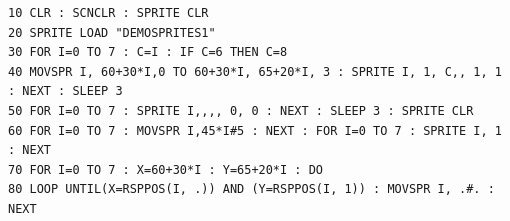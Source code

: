 \begin{description}[leftmargin=2cm,style=nextline]
\begin{tcolorbox}[colback=black,coltext=white]
\verbatimfont{\codefont}
\begin{verbatim}
10 CLR : SCNCLR : SPRITE CLR
20 SPRITE LOAD "DEMOSPRITES1"
30 FOR I=0 TO 7 : C=I : IF C=6 THEN C=8
40 MOVSPR I, 60+30*I,0 TO 60+30*I, 65+20*I, 3 : SPRITE I, 1, C,, 1, 1 : NEXT : SLEEP 3
50 FOR I=0 TO 7 : SPRITE I,,,, 0, 0 : NEXT : SLEEP 3 : SPRITE CLR
60 FOR I=0 TO 7 : MOVSPR I,45*I#5 : NEXT : FOR I=0 TO 7 : SPRITE I, 1 : NEXT
70 FOR I=0 TO 7 : X=60+30*I : Y=65+20*I : DO
80 LOOP UNTIL(X=RSPPOS(I, .)) AND (Y=RSPPOS(I, 1)) : MOVSPR I, .#. : NEXT
\end{verbatim}
\end{tcolorbox}
\end{description}


\newpage
